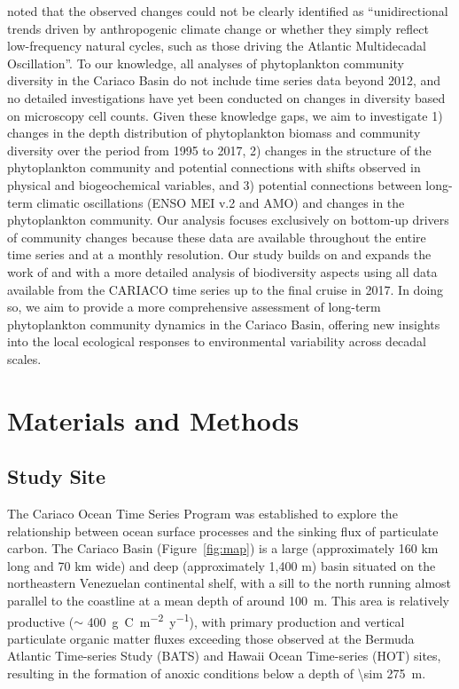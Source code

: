 \documentclass[draft]{agujournal2019}
\begin{document}
 noted that the observed changes could not be clearly identified as ``unidirectional trends driven by anthropogenic climate change or whether they simply reflect low-frequency natural cycles, such as those driving the Atlantic Multidecadal Oscillation''. To our knowledge, all analyses of phytoplankton community diversity in the Cariaco Basin do not include time series data beyond 2012, and no detailed investigations have yet been conducted on changes in diversity based on microscopy cell counts. Given these knowledge gaps, we aim to investigate 1) changes in the depth distribution of phytoplankton biomass and community diversity over the period from 1995 to 2017, 2) changes in the structure of the phytoplankton community and potential connections with shifts observed in physical and biogeochemical variables, and 3) potential connections between long-term climatic oscillations (ENSO MEI v.2 and AMO) and changes in the phytoplankton community. Our analysis focuses exclusively on bottom-up drivers of community changes because these data are available throughout the entire time series and at a monthly resolution. Our study builds on and expands the work of  and  with a more detailed analysis of biodiversity aspects using all data available from the CARIACO time series up to the final cruise in 2017. In doing so, we aim to provide a more comprehensive assessment of long-term phytoplankton community dynamics in the Cariaco Basin, offering new insights into the local ecological responses to environmental variability across decadal scales.
   


\section{Materials and Methods}
%
\subsection{Study Site}
    The Cariaco Ocean Time Series Program was established to explore the relationship between ocean surface processes and the sinking flux of particulate carbon. The Cariaco Basin (Figure~\ref{fig:map}) is a large (approximately 160 km long and 70 km wide) and deep (approximately 1,400 m) basin situated on the northeastern Venezuelan continental shelf, with a sill to the north running almost parallel to the coastline at a mean depth of around \qty{100}{m}. This area is relatively productive ($\sim$ \qty{400}{g.C.m^{-2}.y^{-1}}), with primary production and vertical particulate organic matter fluxes exceeding those observed at the Bermuda Atlantic Time-series Study (BATS) and Hawaii Ocean Time-series (HOT) sites, resulting in the formation of anoxic conditions below a depth of  \qty{\sim 275}{m}.
\end{document}
